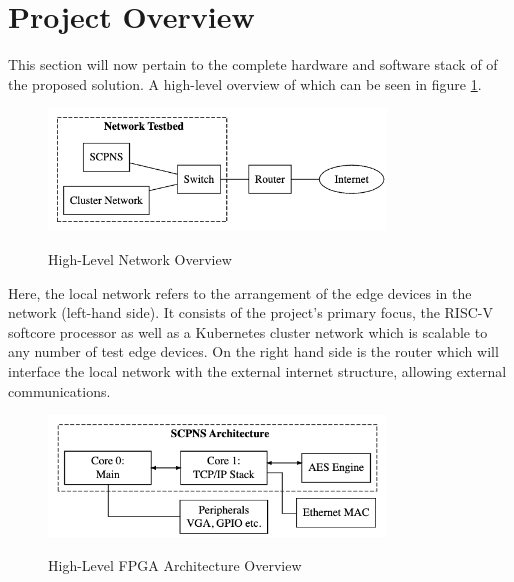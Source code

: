 \section{Project Overview}
\label{sec:Project Overview}
This section will now pertain to the complete hardware and software stack of of the proposed solution. A high-level overview of which can be seen in figure \ref{Fig:1}.
\begin{figure}[ht]
    \begin{center}
        \caption{High-Level Network Overview}
        \includegraphics[width=0.8\textwidth]{./Figures/Network_Overview.png}
        \label{Fig:1}
    \end{center}
\end{figure}

Here, the local network refers to the arrangement of the edge devices in the network (left-hand side). It consists of the project's primary focus, the RISC-V softcore processor as well as a Kubernetes cluster network which is scalable to any number of test edge devices. On the right hand side is the router which will interface the local network with the external internet structure, allowing external communications.

\begin{figure}[h]
    \begin{center}
    \caption{High-Level FPGA Architecture Overview}
    \includegraphics[width=0.8\textwidth]{./Figures/FPGA_Architecture_High_Level.png}
    \label{Fig:2}
    \end{center}
\end{figure}

